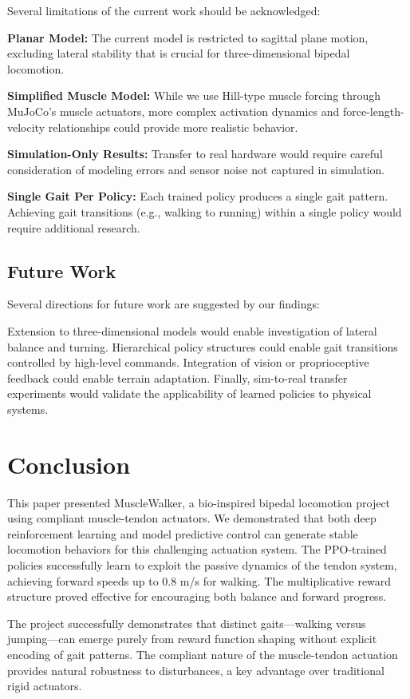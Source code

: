 \documentclass[conference]{IEEEtran}
\begin{document}
Several limitations of the current work should be acknowledged:

\textbf{Planar Model:} The current model is restricted to sagittal plane motion, excluding lateral stability that is crucial for three-dimensional bipedal locomotion.

\textbf{Simplified Muscle Model:} While we use Hill-type muscle forcing through MuJoCo's muscle actuators, more complex activation dynamics and force-length-velocity relationships could provide more realistic behavior.

\textbf{Simulation-Only Results:} Transfer to real hardware would require careful consideration of modeling errors and sensor noise not captured in simulation.

\textbf{Single Gait Per Policy:} Each trained policy produces a single gait pattern. Achieving gait transitions (e.g., walking to running) within a single policy would require additional research.

\subsection{Future Work}

Several directions for future work are suggested by our findings:

Extension to three-dimensional models would enable investigation of lateral balance and turning. Hierarchical policy structures could enable gait transitions controlled by high-level commands. Integration of vision or proprioceptive feedback could enable terrain adaptation. Finally, sim-to-real transfer experiments would validate the applicability of learned policies to physical systems.

\section{Conclusion}

This paper presented MuscleWalker, a bio-inspired bipedal locomotion project using compliant muscle-tendon actuators. We demonstrated that both deep reinforcement learning and model predictive control can generate stable locomotion behaviors for this challenging actuation system. The PPO-trained policies successfully learn to exploit the passive dynamics of the tendon system, achieving forward speeds up to 0.8 m/s for walking. The multiplicative reward structure proved effective for encouraging both balance and forward progress.

The project successfully demonstrates that distinct gaits—walking versus jumping—can emerge purely from reward function shaping without explicit encoding of gait patterns. The compliant nature of the muscle-tendon actuation provides natural robustness to disturbances, a key advantage over traditional rigid actuators.
\end{document}
